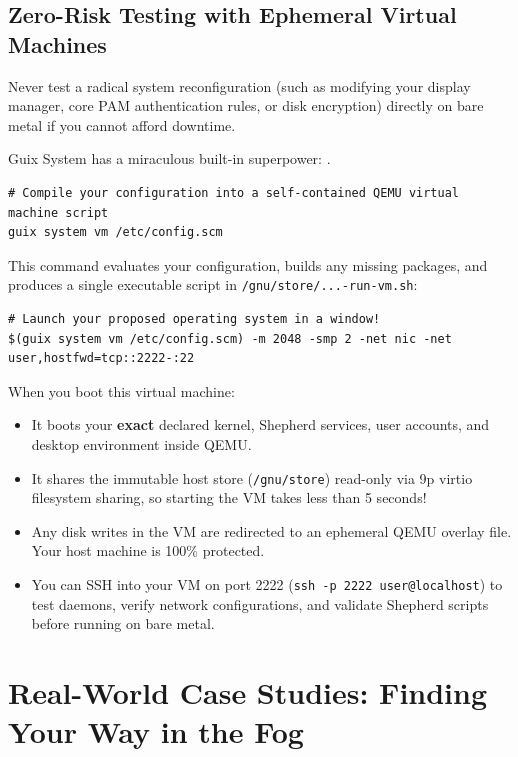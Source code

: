 \subsection{Zero-Risk Testing with Ephemeral Virtual Machines}

Never test a radical system reconfiguration (such as modifying your display manager, core PAM authentication rules, or disk encryption) directly on bare metal if you cannot afford downtime.

Guix System has a miraculous built-in superpower: .

\begin{lstlisting}[style=guixcli]
# Compile your configuration into a self-contained QEMU virtual machine script
guix system vm /etc/config.scm
\end{lstlisting}

This command evaluates your configuration, builds any missing packages, and produces a single executable script in \texttt{/gnu/store/...-run-vm.sh}:

\begin{lstlisting}[style=guixcli]
# Launch your proposed operating system in a window!
$(guix system vm /etc/config.scm) -m 2048 -smp 2 -net nic -net user,hostfwd=tcp::2222-:22
\end{lstlisting}

\begin{alchemybox}
When you boot this virtual machine:
\begin{itemize}
  \item It boots your \textbf{exact} declared kernel, Shepherd services, user accounts, and desktop environment inside QEMU.
  \item It shares the immutable host store (\texttt{/gnu/store}) read-only via 9p virtio filesystem sharing, so starting the VM takes less than 5 seconds!
  \item Any disk writes in the VM are redirected to an ephemeral QEMU overlay file. Your host machine is 100\% protected.
  \item You can SSH into your VM on port 2222 (\texttt{ssh -p 2222 user@localhost}) to test daemons, verify network configurations, and validate Shepherd scripts before running  on bare metal.
\end{itemize}
\end{alchemybox}

\section{Real-World Case Studies: Finding Your Way in the Fog}

